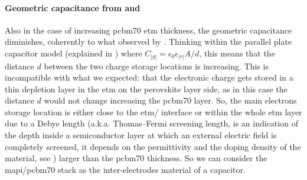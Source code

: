 	\begin{figure}
	\end{figure}

	\paragraph{Geometric capacitance from  and }
	Also in the case of increasing \gls{pcbm70} \gls{etm} thickness, the geometric capacitance diminishes, coherently to what observed by .
	Thinking within the parallel plate capacitor model (explained in ) where $C_|g| = \epsilon_0 \epsilon_|r| A / d$, this means that the distance $d$ between the two charge storage locations is increasing.
	This is incompatible with what we expected: that the electronic charge gets stored in a thin depletion layer in the \gls{etm} on the perovskite layer side, as in this case the distance $d$ would not change increasing the \gls{pcbm70} layer.
	So, the main electrons storage location is either close to the \gls{etm}\-/ interface or within the whole \gls{etm} layer due to a Debye length (a.k.a. Thomas–Fermi screening length, is an indication of the depth inside a semiconductor layer at which an external electric field is completely screened, it depends on the permittivity and the doping density of the material, see ) larger than the \gls{pcbm70} thickness.
	So we can consider the \gls{mapi}\-/\gls{pcbm70} stack as the inter\hyp{}electrodes material of a capacitor.

